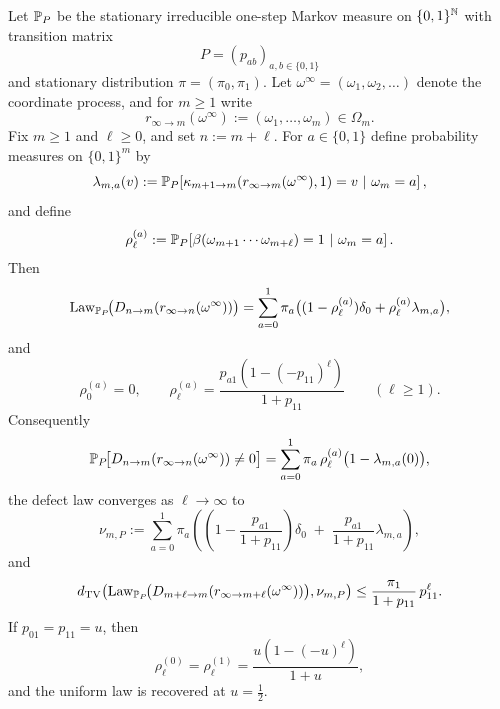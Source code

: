 \begin{theorem}
\label{thm:markov-defect-law}
Let $\mathbb{P}_P$ be the stationary irreducible one-step Markov measure on
$\{0,1\}^{\mathbb{N}}$ with transition matrix
\[
P=(p_{ab})_{a,b\in\{0,1\}}
\]
and stationary distribution $\pi=(\pi_0,\pi_1)$.  Let
$\omega^\infty=(\omega_1,\omega_2,\dots)$ denote the coordinate process, and
for $m\ge 1$ write
\[
r_{\infty\to m}(\omega^\infty):=(\omega_1,\dots,\omega_m)\in\Omega_m.
\]
Fix $m\ge 1$ and $\ell\ge 0$, and set $n:=m+\ell$.  For $a\in\{0,1\}$ define
probability measures on $\{0,1\}^m$ by
\[
\lambda_{m,a}(v)
:=
\mathbb{P}_P\!\left[
\kappa_{m+1\to m}(r_{\infty\to m}(\omega^\infty),1)=v
\ \middle|\
\omega_m=a
\right],
\]
and define
\[
\rho_\ell^{(a)}
:=
\mathbb{P}_P\!\left[
\beta(\omega_{m+1}\cdots\omega_{m+\ell})=1
\ \middle|\
\omega_m=a
\right].
\]
Then
\[
\operatorname{Law}_{\mathbb{P}_P}\!\bigl(D_{n\to m}(r_{\infty\to n}(\omega^\infty))\bigr)
=
\sum_{a=0}^1
\pi_a\bigl((1-\rho_\ell^{(a)})\delta_0+\rho_\ell^{(a)}\lambda_{m,a}\bigr),
\]
and
\[
\rho_0^{(a)}=0,
\qquad
\rho_\ell^{(a)}
=
\frac{p_{a1}(1-(-p_{11})^\ell)}{1+p_{11}}
\qquad (\ell\ge 1).
\]
Consequently
\[
\mathbb{P}_P\!\bigl[D_{n\to m}(r_{\infty\to n}(\omega^\infty))\ne 0\bigr]
=
\sum_{a=0}^1
\pi_a\,\rho_\ell^{(a)}\bigl(1-\lambda_{m,a}(0)\bigr),
\]
the defect law converges as $\ell\to\infty$ to
\[
\nu_{m,P}
:=
\sum_{a=0}^1
\pi_a\left(
\left(1-\frac{p_{a1}}{1+p_{11}}\right)\delta_0
\;+\;
\frac{p_{a1}}{1+p_{11}}\lambda_{m,a}
\right),
\]
and
\[
d_{\mathrm{TV}}
\!\left(
\operatorname{Law}_{\mathbb{P}_P}\!\bigl(D_{m+\ell\to m}(r_{\infty\to m+\ell}(\omega^\infty))\bigr),
\nu_{m,P}
\right)
\le
\frac{\pi_1}{1+p_{11}}\,p_{11}^{\ell}.
\]
If $p_{01}=p_{11}=u$, then
\[
\rho_\ell^{(0)}=\rho_\ell^{(1)}
=
\frac{u(1-(-u)^\ell)}{1+u},
\]
and the uniform law is recovered at $u=\frac12$.
\end{theorem}

